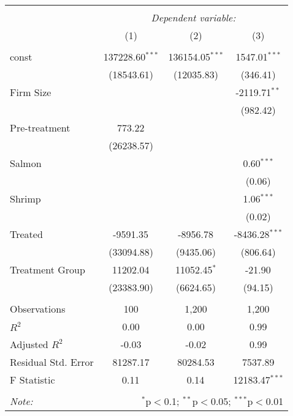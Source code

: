 \begin{table}[!htbp] \centering
\begin{tabular}{@{\extracolsep{5pt}}lccc}
\\[-1.8ex]\hline
\hline \\[-1.8ex]
& \multicolumn{3}{c}{\textit{Dependent variable:}} \
\cr \cline{3-4}
\\[-1.8ex] & (1) & (2) & (3) \\
\hline \\[-1.8ex]
 const & 137228.60$^{***}$ & 136154.05$^{***}$ & 1547.01$^{***}$ \\
  & (18543.61) & (12035.83) & (346.41) \\
 Firm Size & & & -2119.71$^{**}$ \\
  & & & (982.42) \\
 Pre-treatment & 773.22$^{}$ & & \\
  & (26238.57) & & \\
 Salmon & & & 0.60$^{***}$ \\
  & & & (0.06) \\
 Shrimp & & & 1.06$^{***}$ \\
  & & & (0.02) \\
 Treated & -9591.35$^{}$ & -8956.78$^{}$ & -8436.28$^{***}$ \\
  & (33094.88) & (9435.06) & (806.64) \\
 Treatment Group & 11202.04$^{}$ & 11052.45$^{*}$ & -21.90$^{}$ \\
  & (23383.90) & (6624.65) & (94.15) \\
\hline \\[-1.8ex]
 Observations & 100 & 1,200 & 1,200 \\
 $R^2$ & 0.00 & 0.00 & 0.99 \\
 Adjusted $R^2$ & -0.03 & -0.02 & 0.99 \\
 Residual Std. Error & 81287.17 & 80284.53 & 7537.89  \\
 F Statistic & 0.11$^{}$  & 0.14$^{}$  & 12183.47$^{***}$  \\
\hline
\hline \\[-1.8ex]
\textit{Note:} & \multicolumn{3}{r}{$^{*}$p$<$0.1; $^{**}$p$<$0.05; $^{***}$p$<$0.01} \\
\end{tabular}
\end{table}